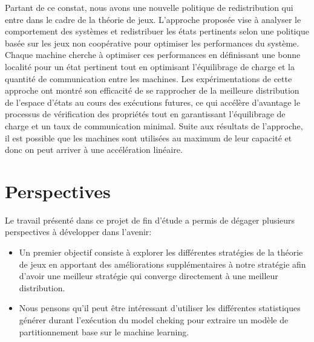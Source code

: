 Partant de ce constat, nous avons une nouvelle politique de redistribution qui entre dans le cadre de la théorie de jeux. L'approche proposée vise à analyser le comportement des systèmes et redistribuer les états pertinents selon une politique basée sur les jeux non coopérative pour optimiser les performances du système. Chaque machine cherche à optimiser ces performances en définissant une bonne localité pour un état pertinent tout en optimisant l’équilibrage de charge et la quantité de communication entre les machines. Les expérimentations de cette approche ont montré son efficacité de se rapprocher de la meilleure distribution de l’espace d’états au cours des exécutions futures, ce qui accélère d’avantage le processus de vérification des propriétés tout en garantissant l’équilibrage de  charge et un taux de communication minimal. Suite aux résultats de l'approche, il est possible que les machines sont utilisées au maximum de leur capacité et donc on peut arriver à une accélération linéaire.

\section*{Perspectives}
Le travail présenté dans ce projet de fin d'étude a permis de dégager plusieurs perspectives à développer dans l’avenir:
\begin{itemize}
	\item Un premier objectif consiste à explorer les différentes stratégies de la théorie de jeux en apportant des améliorations supplémentaires à notre stratégie afin d’avoir une meilleur stratégie qui converge directement à une meilleur distribution.
	\item Nous pensons qu’il peut être intéressant d'utiliser les différentes statistiques générer durant l'exécution du model cheking pour  extraire un modèle de partitionnement base sur le machine learning.
\end{itemize}
